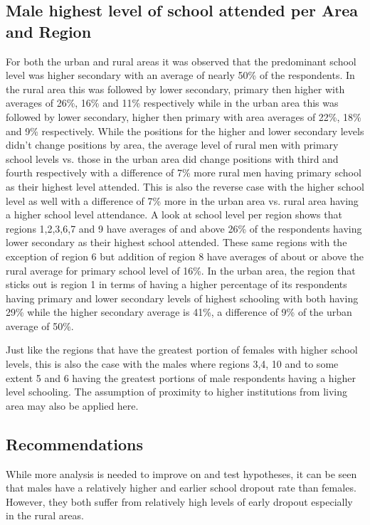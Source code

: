 \documentclass[stu, 12pt, floatsintext,longtable]{apa7}
\begin{document}
\subsection{Male highest level of school attended per Area and Region}
For both the urban and rural areas it was observed that the predominant school
level was higher secondary with an average of nearly 50\% of the respondents.
In the rural area this was followed by lower secondary, primary then higher
with averages of 26\%, 16\% and 11\% respectively while in the
urban area this was followed by lower secondary, higher then primary with area
averages of 22\%, 18\% and 9\%
respectively.
While the positions for the higher and lower secondary levels didn't change
positions
by area, the average level of rural men with primary school levels vs. those in
the urban area did
change positions with third and fourth respectively with a difference of 7\%
more rural men
having primary school as their highest level attended. This is also the reverse
case with the higher school level as
well with a difference of 7\% more in the urban area vs. rural area having a
higher school level attendance.
A look at school level per region shows that regions 1,2,3,6,7 and 9 have
averages of and above 26\%
of the respondents having lower secondary as their highest school attended.
These same regions with the exception of region 6 but addition of region 8 have
averages of
about or above the rural average for primary school level of 16\%.
In the urban area, the region that sticks out is region 1 in terms of having a
higher
percentage of its respondents having primary and lower secondary levels of
highest
schooling with both
having 29\% while the higher secondary average is 41\%, a difference of 9\% of
the urban average of 50\%.

Just like the regions that have the greatest portion of females with higher
school levels,
this is also the case with the males where regions 3,4, 10 and to some extent 5
and 6 having the
greatest portions of male respondents having a higher level schooling.
The assumption of proximity to higher institutions from living area may also be
applied here.

\subsection{Recommendations}

While more analysis is needed to improve on and test hypotheses, it can be seen
that males have a relatively higher and earlier
school dropout rate than females. However, they both suffer from relatively
high levels
of early dropout especially in the rural areas.
\end{document}
